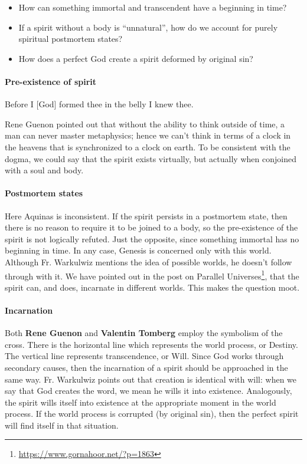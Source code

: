 \begin{itemize}
\item How can something immortal and transcendent have a beginning in time? 
\item If a spirit without a body is “unnatural”, how do we account for purely spiritual postmortem states? 
\item How does a perfect God create a spirit deformed by original sin? 
\end{itemize}

\paragraph{Pre-existence of spirit}
\begin{quotex}
Before I [God] formed thee in the belly I knew thee. 

\end{quotex}
Rene Guenon pointed out that without the ability to think outside of time, a man can never master metaphysics; hence we can't think in terms of a clock in the heavens that is synchronized to a clock on earth. To be consistent with the dogma, we could say that the spirit exists virtually, but actually when conjoined with a soul and body.

\paragraph{Postmortem states}
Here Aquinas is inconsistent. If the spirit persists in a postmortem state, then there is no reason to require it to be joined to a body, so the pre-existence of the spirit is not logically refuted. Just the opposite, since something immortal has no beginning in time. In any case, Genesis is concerned only with this world. Although Fr. Warkulwiz mentions the idea of possible worlds, he doesn't follow through with it. We have pointed out in the post on Parallel Universes\footnote{\url{https://www.gornahoor.net/?p=1863}}, that the spirit can, and does, incarnate in different worlds. This makes the question moot.

\paragraph{Incarnation}
Both \textbf{Rene Guenon} and \textbf{Valentin Tomberg} employ the symbolism of the cross. There is the horizontal line which represents the world process, or Destiny. The vertical line represents transcendence, or Will. Since God works through secondary causes, then the incarnation of a spirit should be approached in the same way. Fr. Warkulwiz points out that creation is identical with will: when we say that God creates the word, we mean he wills it into existence. Analogously, the spirit wills itself into existence at the appropriate moment in the world process. If the world process is corrupted (by original sin), then the perfect spirit will find itself in that situation.

